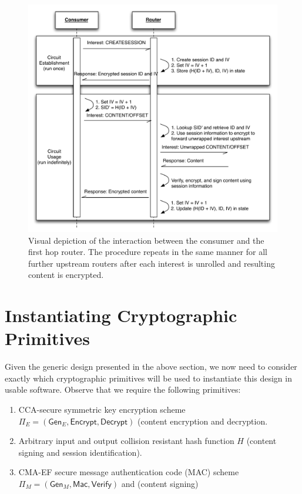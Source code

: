 \documentclass[10pt]{article}
\begin{document}
\begin{figure}[ht!]
\begin{center}
\includegraphics[scale=0.65]{./images/circuit_usage.pdf}
\end{center}
\caption{Visual depiction of the interaction between the consumer and the first hop router. The procedure repeats in the same manner for all further upstream routers after each interest is unrolled and resulting content is encrypted.}
\label{fig:circuit_usage}
\end{figure}

\section{Instantiating Cryptographic Primitives}
Given the generic design presented in the above section, we now need to consider exactly which cryptographic primitives will be used to instantiate this design in usable software. Observe that we require the following primitives:
\begin{enumerate}
  \item CCA-secure symmetric key encryption scheme $\Pi_E = (\mathsf{Gen}_E, \mathsf{Encrypt}, \mathsf{Decrypt})$ (content encryption and decryption.
  \item Arbitrary input and output collision resistant hash function $H$ (content signing and session identification).
  \item CMA-EF secure message authentication code (MAC) scheme $\Pi_M = (\mathsf{Gen}_M, \mathsf{Mac}, \mathsf{Verify})$ and (content signing)
\end{enumerate}
\end{document}
